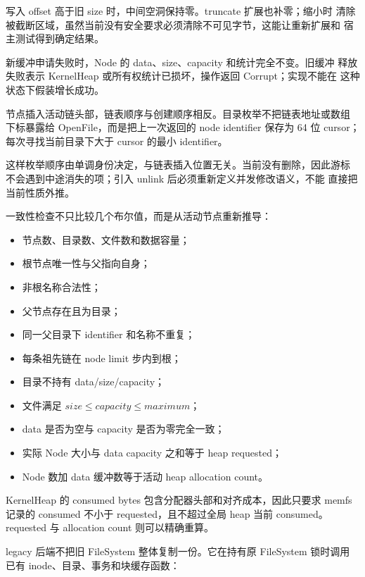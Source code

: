 写入 offset 高于旧 size 时，中间空洞保持零。truncate 扩展也补零；缩小时
清除被截断区域，虽然当前没有安全要求必须清除不可见字节，这能让重新扩展和
宿主测试得到确定结果。

\begin{failurebox}
新缓冲申请失败时，Node 的 data、size、capacity 和统计完全不变。旧缓冲
释放失败表示 KernelHeap 或所有权统计已损坏，操作返回 Corrupt；实现不能在
这种状态下假装增长成功。
\end{failurebox}

节点插入活动链头部，链表顺序与创建顺序相反。目录枚举不把链表地址或数组
下标暴露给 OpenFile，而是把上一次返回的 node identifier 保存为 64 位
cursor；每次寻找当前目录下大于 cursor 的最小 identifier。

这样枚举顺序由单调身份决定，与链表插入位置无关。当前没有删除，因此游标
不会遇到中途消失的项；引入 unlink 后必须重新定义并发修改语义，不能
直接把当前性质外推。

一致性检查不只比较几个布尔值，而是从活动节点重新推导：

\begin{itemize}
  \item 节点数、目录数、文件数和数据容量；
  \item 根节点唯一性与父指向自身；
  \item 非根名称合法性；
  \item 父节点存在且为目录；
  \item 同一父目录下 identifier 和名称不重复；
  \item 每条祖先链在 node limit 步内到根；
  \item 目录不持有 data/size/capacity；
  \item 文件满足 \(size\le capacity\le maximum\)；
  \item data 是否为空与 capacity 是否为零完全一致；
  \item 实际 Node 大小与 data capacity 之和等于 heap requested；
  \item Node 数加 data 缓冲数等于活动 heap allocation count。
\end{itemize}

KernelHeap 的 consumed bytes 包含分配器头部和对齐成本，因此只要求 memfs
记录的 consumed 不小于 requested，且不超过全局 heap 当前 consumed。
requested 与 allocation count 则可以精确重算。

legacy 后端不把旧 FileSystem 整体复制一份。它在持有原 FileSystem 锁时调用
已有 inode、目录、事务和块缓存函数：

